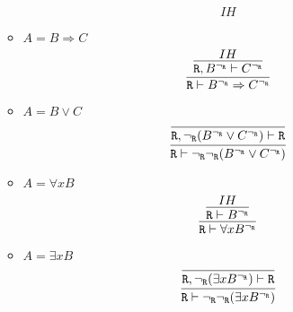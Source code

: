 \begin{enumerate}[(i)]
\begin{itemize}
$${{                    }{
                        IH
                    }
                }
            $$
        \item $A=B \Rightarrow C$
            $$
                \infer{
                    \R \vdash B^{\neg_\R} \Rightarrow C^{\neg_\R}
                }{
                    \infer{
                        \R, B^{\neg_\R} \vdash C^{\neg_\R}
                    }{
                        IH
                    }
                }
            $$
        \item $A=B \vee C$
            $$
                \infer{
                    \R \vdash \neg_\R\neg_\R(B^{\neg_\R} \vee C^{\neg_\R})
                }{
                    \infer{
                        \R, \neg_\R(B^{\neg_\R} \vee C^{\neg_\R}) \vdash \R
                    }{
                    }
                }
            $$
        \item $A=\forall x B$
            $$
                \infer{
                    \R \vdash \forall x B^{\neg_\R}
                }{
                    \infer{
                        \R \vdash B^{\neg_\R}
                    }{
                        IH
                    }
                }
            $$
        \item $A=\exists x B$
            $$
                \infer{
                    \R \vdash \neg_\R\neg_\R(\exists x B^{\neg_\R})
                }{
                    \infer{
                        \R, \neg_\R(\exists x B^{\neg_\R}) \vdash \R
                    }{
                    }
                }
            $$
    \end{itemize}


\end{enumerate}
